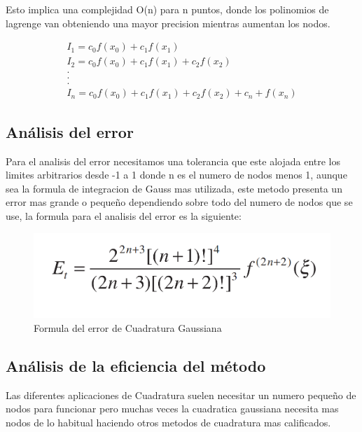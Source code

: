 \documentclass[journal,transmag]{IEEEtran}
\theoremstyle{mytheoremstyle}
\theoremstyle{mytheoremstyle}
\theoremstyle{myproblemstyle}
\begin{document}
            Esto implica una complejidad O(n) para n puntos, donde los polinomios de lagrenge van obteniendo una mayor precision mientras aumentan los nodos.
            
            \begin{align*}
                I_1 = c_0f(x_0)+c_1f(x_1)\\
                I_2= c_0f(x_0)+c_1f(x_1)+c_2f(x_2)\\
                .\\
                .\\
                .\\
                I_n= c_0f(x_0)+c_1f(x_1)+c_2f(x_2)+c_n+f(x_n)
            \end{align*}
            
            
            \subsection{Análisis del error}
            Para el analisis del error necesitamos una tolerancia que este alojada entre los limites arbitrarios desde -1 a 1 donde n es el numero de nodos menos 1, aunque sea la formula de integracion de Gauss mas utilizada, este metodo presenta un error mas grande o pequeño dependiendo sobre todo del numero de nodos que se use, la formula para el analisis del error es la siguiente: 
            
            \begin{figure}[h]
                \centering
                \includegraphics[width=\linewidth]{images/error_gauss.PNG}
                \caption{Formula del error de Cuadratura Gaussiana}
                \label{fig:Formula_error_Gauss}
            \end{figure}
            
            
            
            
            \subsection{Análisis de la eficiencia del método}
            Las diferentes aplicaciones de Cuadratura suelen necesitar un numero pequeño de nodos para funcionar pero muchas veces la cuadratica gaussiana necesita mas nodos de lo habitual haciendo otros metodos de cuadratura mas calificados.
            
\end{document}
